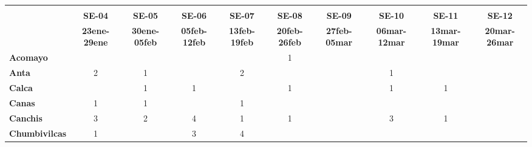 \begin{tabular}{lccccccccc}
	\textbf{}              	  & \multicolumn{1}{l}{}                        & \multicolumn{1}{l}{}      & \multicolumn{1}{l}{}                         & \multicolumn{1}{l}{}                         & \multicolumn{1}{l}{}                         & \multicolumn{1}{l}{}                        & \multicolumn{1}{l}{}                         & \multicolumn{1}{l}{}                         & \multicolumn{1}{l}{}     \\
	\textbf{}                                                                               
	&\textbf{SE-04}								&\textbf{SE-05}	
	&\textbf{SE-06}								&\textbf{SE-07}				&\textbf{SE-08}
	&\textbf{SE-09}								&\textbf{SE-10}
	&\textbf{SE-11}								&\textbf{SE-12}\\
	\textbf{}              	  	
	&\textbf{23ene-29ene}						&\textbf{30ene-05feb}
	&\textbf{05feb-12feb}						&\textbf{13feb-19feb}
	&\textbf{20feb-26feb}						&\textbf{27feb-05mar}
	&\textbf{06mar-12mar}						&\textbf{13mar-19mar}
	&\textbf{20mar-26mar}\\
	\textbf{Acomayo}                        	
	&\cellcolor[HTML]{FCC46C}
	&\cellcolor[HTML]{FCC46C}					&\cellcolor[HTML]{FCC46C}
	&\cellcolor[HTML]{FCC46C}					&1
	&\cellcolor[HTML]{FCC46C}					&\cellcolor[HTML]{FCC46C} 
	&\cellcolor[HTML]{FCC46C}					&\cellcolor[HTML]{FCC46C}\\
	\textbf{Anta}                                                          				
	&2 				
	&1											&\cellcolor[HTML]{FCC46C}					&2
	&\cellcolor[HTML]{FCC46C}					&\cellcolor[HTML]{FCC46C}					&1
	&\cellcolor[HTML]{FCC46C}					&\cellcolor[HTML]{FCC46C}\\
	\textbf{Calca}      				       								            		&\cellcolor[HTML]{FCC46C}
	&1 											&1	
	&\cellcolor[HTML]{FCC46C}					&1											&\cellcolor[HTML]{FCC46C} 					&1											&1	&\cellcolor[HTML]{FCC46C}\\             			
	\textbf{Canas}                              		
	&1
	&1											&\cellcolor[HTML]{FCC46C}
	&1											&\cellcolor[HTML]{FCC46C}
	&\cellcolor[HTML]{FCC46C}					&\cellcolor[HTML]{FCC46C}
	&\cellcolor[HTML]{FCC46C} 					&\cellcolor[HTML]{FCC46C}\\
	\textbf{Canchis}                             		
	&3
	&2											&4
	&1											&1
	&\cellcolor[HTML]{FCC46C}					&3
	&1											&\cellcolor[HTML]{FCC46C}\\
	\textbf{Chumbivilcas}                      			
	&1
	&\cellcolor[HTML]{FCC46C}					&3
	&4											&\cellcolor[HTML]{FCC46C}

\end{tabular}
